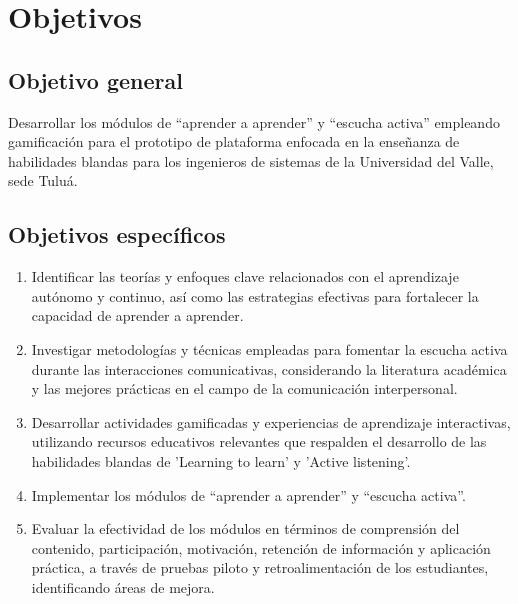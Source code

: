 \section{Objetivos}

\subsection{Objetivo general}

Desarrollar los módulos de “aprender a aprender” y “escucha activa” empleando gamificación para el prototipo de plataforma enfocada en la enseñanza de habilidades blandas para los ingenieros de sistemas de la Universidad del Valle, sede Tuluá.

\subsection{Objetivos específicos}			

\begin{enumerate} [label=\arabic*, leftmargin=2.5em, itemsep=0.6\baselineskip]
    \item Identificar las teorías y enfoques clave relacionados con el aprendizaje autónomo y continuo, así como las estrategias efectivas para fortalecer la capacidad de aprender a aprender.
    \item Investigar metodologías y técnicas empleadas para fomentar la escucha activa durante las interacciones comunicativas, considerando la literatura académica y las mejores prácticas en el campo de la comunicación interpersonal.
    \item Desarrollar actividades gamificadas y experiencias de aprendizaje interactivas, utilizando recursos educativos relevantes que respalden el desarrollo de las habilidades blandas de 'Learning to learn' y 'Active listening'.
    \item Implementar los módulos de “aprender a aprender” y “escucha activa”.
    \item Evaluar la efectividad de los módulos en términos de comprensión del contenido, participación, motivación, retención de información y aplicación práctica, a través de pruebas piloto y retroalimentación de los estudiantes, identificando áreas de mejora.
\end{enumerate}
